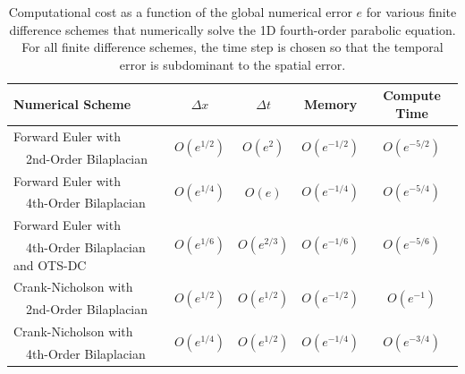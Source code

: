 \documentclass[fleqn,12pt,twoside]{article}
\def\dt{\Delta t}
\def\dx{\Delta x}
\begin{document}
\begin{table}[tb]
\caption{
Computational cost as a function of the global numerical error $e$
for various finite difference schemes that numerically solve the 1D 
fourth-order parabolic equation.  For all finite difference schemes, the 
time step is chosen so that the temporal error is subdominant to the spatial
error.
}
\label{tab:comp_perf_vs_err_4th_order_parabolic} 
\renewcommand{\arraystretch}{1.3}
\centering
\begin{tabular}{lcccc}
  \hline
  {\bf Numerical Scheme} & $\dx$ 
  & $\dt$
  & {\bf Memory}
  & {\bf Compute Time}
  \\
  \hline 
  Forward Euler with 
    & \multirow{2}{*}{$O\left( e^{1/2} \right)$} 
    & \multirow{2}{*}{$O\left( e^{2} \right)$}
    & \multirow{2}{*}{$O\left( e^{-1/2} \right)$} 
    & \multirow{2}{*}{$O\left( e^{-5/2} \right)$} \\
  \ \ 2nd-Order Bilaplacian & & & & \\
  Forward Euler with 
    & \multirow{2}{*}{$O\left( e^{1/4} \right)$}
    & \multirow{2}{*}{$O\left( e \right)$}
    & \multirow{2}{*}{$O\left( e^{-1/4} \right)$} 
    & \multirow{2}{*}{$O\left( e^{-{5/4}} \right)$} \\
  \ \ 4th-Order Bilaplacian & & & & \\
  Forward Euler with 
    & \multirow{2}{*}{$O\left( e^{1/6} \right)$} 
    & \multirow{2}{*}{$O\left( e^{2/3} \right)$} 
    & \multirow{2}{*}{$O\left( e^{-1/6} \right)$} 
    & \multirow{2}{*}{$O\left( e^{-5/6} \right)$} \\ 
  \ \ 4th-Order Bilaplacian and OTS-DC & & & & \\
  Crank-Nicholson with 
    & \multirow{2}{*}{$O\left( e^{1/2} \right)$} 
    & \multirow{2}{*}{$O\left( e^{1/2} \right)$} 
    & \multirow{2}{*}{$O\left( e^{-1/2} \right)$} 
    & \multirow{2}{*}{$O\left( e^{-1} \right)$} \\
  \ \ 2nd-Order Bilaplacian & & & & \\
  Crank-Nicholson with 
    & \multirow{2}{*}{$O\left( e^{1/4} \right)$} 
    & \multirow{2}{*}{$O\left( e^{1/2} \right)$} 
    & \multirow{2}{*}{$O\left( e^{-1/4} \right)$} 
    & \multirow{2}{*}{$O\left( e^{-3/4} \right)$} \\
  \ \ 4th-Order Bilaplacian & & & & \\
  \hline
\end{tabular}
\end{table}
\end{document}
